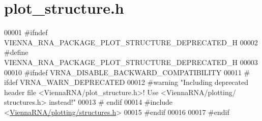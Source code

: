\hypertarget{plot__structure_8h_source}{}\section{plot\+\_\+structure.\+h}
\label{plot__structure_8h_source}

\begin{DoxyCode}
00001 \textcolor{preprocessor}{#ifndef VIENNA\_RNA\_PACKAGE\_PLOT\_STRUCTURE\_DEPRECATED\_H}
00002 \textcolor{preprocessor}{#define VIENNA\_RNA\_PACKAGE\_PLOT\_STRUCTURE\_DEPRECATED\_H}
00003 
00010 \textcolor{preprocessor}{#ifndef VRNA\_DISABLE\_BACKWARD\_COMPATIBILITY}
00011 \textcolor{preprocessor}{# ifdef VRNA\_WARN\_DEPRECATED}
00012 \textcolor{preprocessor}{#warning "Including deprecated header file <ViennaRNA/plot\_structure.h>! Use <ViennaRNA/plotting/
      structures.h> instead!"}
00013 \textcolor{preprocessor}{# endif}
00014 \textcolor{preprocessor}{#include <\hyperlink{plotting_2structures_8h}{ViennaRNA/plotting/structures.h}>}
00015 \textcolor{preprocessor}{#endif}
00016 
00017 \textcolor{preprocessor}{#endif}
\end{DoxyCode}
